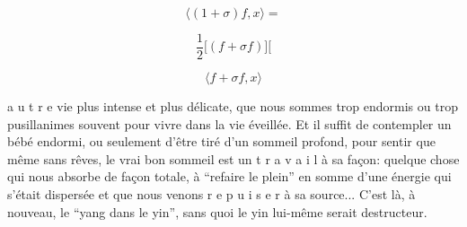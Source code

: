 
\[ \langle(1+\sigma)f,x\rangle= \]

\[ \frac12\big[(f+\sigma f)\big]\big[ \]

\[ \langle f+\sigma f,x\rangle \]


a u t r e vie plus intense et plus délicate, que nous sommes trop endormis ou trop pusillanimes souvent pour vivre dans la vie éveillée. Et il suffit de contempler un bébé endormi, ou seulement d'être tiré d'un sommeil profond, pour sentir que même sans rêves, le vrai bon sommeil est un t r a v a i l à sa façon: quelque chose qui nous absorbe de façon totale, à ``refaire le plein'' en somme d'une énergie qui s'était dispersée et que nous venons r e p u i s e r à sa source... C'est là, à nouveau, le ``yang dans le yin'', sans quoi le yin lui-même serait destructeur.

